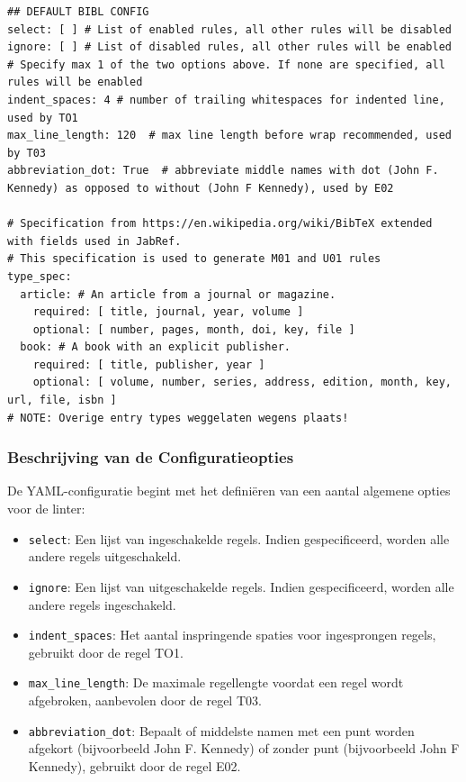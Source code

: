 \begin{verbatim}
## DEFAULT BIBL CONFIG
select: [ ] # List of enabled rules, all other rules will be disabled
ignore: [ ] # List of disabled rules, all other rules will be enabled
# Specify max 1 of the two options above. If none are specified, all rules will be enabled
indent_spaces: 4 # number of trailing whitespaces for indented line, used by TO1
max_line_length: 120  # max line length before wrap recommended, used by T03
abbreviation_dot: True  # abbreviate middle names with dot (John F. Kennedy) as opposed to without (John F Kennedy), used by E02

# Specification from https://en.wikipedia.org/wiki/BibTeX extended with fields used in JabRef.
# This specification is used to generate M01 and U01 rules
type_spec:
  article: # An article from a journal or magazine.
    required: [ title, journal, year, volume ]
    optional: [ number, pages, month, doi, key, file ]
  book: # A book with an explicit publisher.
    required: [ title, publisher, year ]
    optional: [ volume, number, series, address, edition, month, key, url, file, isbn ]
# NOTE: Overige entry types weggelaten wegens plaats!
\end{verbatim}

\subsubsection{Beschrijving van de Configuratieopties}

De YAML-configuratie begint met het definiëren van een aantal algemene opties voor de linter:

\begin{itemize}
    \item \texttt{select}: Een lijst van ingeschakelde regels. Indien gespecificeerd, worden alle andere regels uitgeschakeld.
    \item \texttt{ignore}: Een lijst van uitgeschakelde regels. Indien gespecificeerd, worden alle andere regels ingeschakeld.
    \item \texttt{indent\_spaces}: Het aantal inspringende spaties voor ingesprongen regels, gebruikt door de regel TO1.
    \item \texttt{max\_line\_length}: De maximale regellengte voordat een regel wordt afgebroken, aanbevolen door de regel T03.
    \item \texttt{abbreviation\_dot}: Bepaalt of middelste namen met een punt worden afgekort (bijvoorbeeld John F. Kennedy) of zonder punt (bijvoorbeeld John F Kennedy), gebruikt door de regel E02.
\end{itemize}

